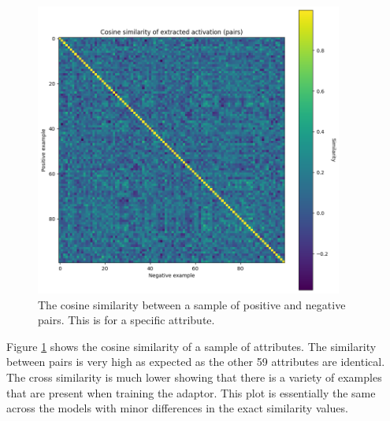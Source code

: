 \begin{figure}
    \centering
    \includegraphics[width=0.9\textwidth]{figures/cosine-similarity.png}
    \caption{The cosine similarity between a sample of positive and negative pairs. This is for a specific attribute.}
    \label{fig:cosine-similarity}
\end{figure}

Figure \ref{fig:cosine-similarity} shows the cosine similarity of a sample of attributes.
The similarity between pairs is very high as expected as the other 59 attributes are identical.
The cross similarity is much lower showing that there is a variety of examples that are present when training the adaptor.
This plot is essentially the same across the models with minor differences in the exact similarity values.

